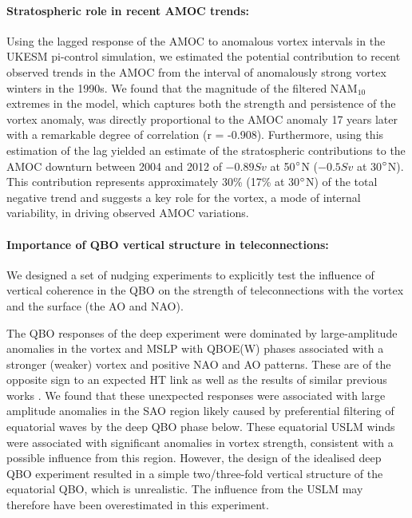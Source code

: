 \paragraph{Stratospheric role in recent AMOC trends:}
Using the lagged response of the AMOC to anomalous vortex intervals in the UKESM pi-control simulation, we estimated the potential contribution to recent observed trends in the AMOC from the interval of anomalously strong vortex winters in the 1990s. We found that the magnitude of the filtered NAM$_{10}$ extremes in the model, which captures both the strength and persistence of the vortex anomaly, was directly proportional to the AMOC anomaly 17 years later with a remarkable degree of correlation (r = -0.908). Furthermore, using this estimation of the lag yielded an estimate of the stratospheric contributions to the AMOC downturn between 2004 and 2012 of $-0.89Sv$ at 50$\degree$N ($-0.5Sv$ at 30$\degree$N). This contribution represents approximately 30\% (17\% at 30$\degree$N) of the total negative trend and suggests a key role for the vortex, a mode of internal variability, in driving observed AMOC variations. 

\paragraph{Importance of QBO vertical structure in teleconnections:}
We designed a set of nudging experiments to explicitly test the influence of vertical coherence in the QBO on the strength of teleconnections with the vortex and the surface (the AO and NAO).

The QBO responses of the deep experiment were dominated by large-amplitude anomalies in the vortex and MSLP with QBOE(W) phases associated with a stronger (weaker) vortex and positive NAO and AO patterns. These are of the opposite sign to an expected HT link as well as the results of similar previous works \citep{graySurface2018b, andrewsObserved2019d}. We found that these unexpected responses were associated with large amplitude anomalies in the SAO region likely caused by preferential filtering of equatorial waves by the deep QBO phase below. These equatorial USLM winds were associated with significant anomalies in vortex strength, consistent with a possible influence from this region. However, the design of the idealised deep QBO experiment resulted in a simple two/three-fold vertical structure of the equatorial QBO, which is unrealistic. The influence from the USLM may therefore have been overestimated in this experiment.

